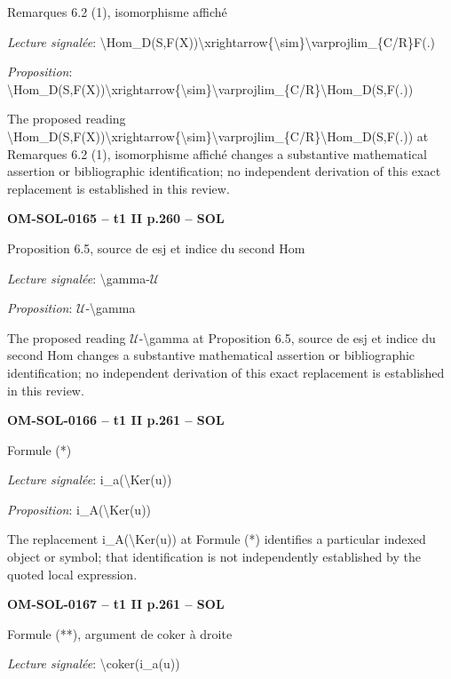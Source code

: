 Remarques 6.2 (1), isomorphisme affiché\par
\emph{Lecture signalée}: \textbackslash{}Hom\_D(S,F(X))\textbackslash{}xrightarrow\{\textbackslash{}sim\}\textbackslash{}varprojlim\_\{C/R\}F(.)\par
\emph{Proposition}: \textbackslash{}Hom\_D(S,F(X))\textbackslash{}xrightarrow\{\textbackslash{}sim\}\textbackslash{}varprojlim\_\{C/R\}\textbackslash{}Hom\_D(S,F(.))\par
The proposed reading \textbackslash{}Hom\_D(S,F(X))\textbackslash{}xrightarrow\{\textbackslash{}sim\}\textbackslash{}varprojlim\_\{C/R\}\textbackslash{}Hom\_D(S,F(.)) at Remarques 6.2 (1), isomorphisme affiché changes a substantive mathematical assertion or bibliographic identification; no independent derivation of this exact replacement is established in this review.\par
\par\noindent\textbf{OM-SOL-0165 -- t1 II p.260 -- SOL}\par
Proposition 6.5, source de esj et indice du second Hom\par
\emph{Lecture signalée}: \textbackslash{}gamma-\ensuremath{𝒰}\par
\emph{Proposition}: \ensuremath{𝒰}-\textbackslash{}gamma\par
The proposed reading \ensuremath{𝒰}-\textbackslash{}gamma at Proposition 6.5, source de esj et indice du second Hom changes a substantive mathematical assertion or bibliographic identification; no independent derivation of this exact replacement is established in this review.\par
\par\noindent\textbf{OM-SOL-0166 -- t1 II p.261 -- SOL}\par
Formule (*)\par
\emph{Lecture signalée}: i\_a(\textbackslash{}Ker(u))\par
\emph{Proposition}: i\_A(\textbackslash{}Ker(u))\par
The replacement i\_A(\textbackslash{}Ker(u)) at Formule (*) identifies a particular indexed object or symbol; that identification is not independently established by the quoted local expression.\par
\par\noindent\textbf{OM-SOL-0167 -- t1 II p.261 -- SOL}\par
Formule (**), argument de coker à droite\par
\emph{Lecture signalée}: \textbackslash{}coker(i\_a(u))\par
